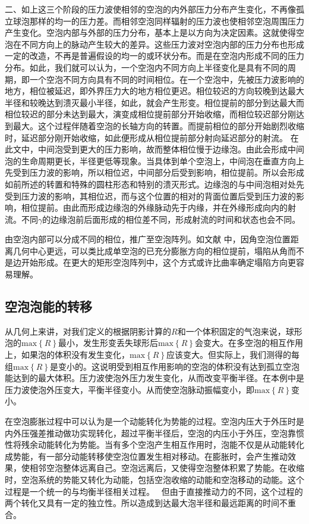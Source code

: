 二、如上这三个阶段的压力波使相邻的空泡的内外部压力分布产生变化，不再像孤立球泡那样的均一的压力差。而相邻空泡同样辐射的压力波也使相邻空泡周围压力产生变化。空泡内部与外部的压力分布，基本上是以方向为决定因素。这就使得空泡在不同方向上的脉动产生较大的差异。这些压力波对空泡内部的压力分布也形成一定的改造，不再是普遍假设的均一的或环状分布。而是在空泡内形成不同的压力分布。如此，我们就可以认为，一个空泡内不同方向上半径变化是具有不同的周期，即一个空泡不同方向具有不同的时间相位。在一个空泡中，先被压力波影响的地方，相位被延迟，即外界压力大的地方相位更迟。相位较迟的方向较晚到达最大半径和较晚达到溃灭最小半径，如此，就会产生形变。相位提前的部分到达最大而相位较迟的部分未达到最大，演变成相位提前部分开始收缩，而相位较迟部分刚达到最大。这个过程伴随着空泡的长轴方向的转置。而提前相位的部分开始剧烈收缩时，延迟部分刚开始收缩，如此便形成从相位提前部分射向延迟部分的射流。
在此文中，中间泡受到更大的压力影响，故而整体相位慢于边缘泡。由此会形成中间泡的生命周期更长，半径更低等现象。当具体到单个空泡上，中间泡在垂直方向上先受到压力波的影响，所以相位迟，中间部分后受到影响，相位提前。所以会形成如前所述的转置和特殊的圆柱形态和特别的溃灭形式。边缘泡的与中间泡相对处先受到压力波的影响，其相位迟，而与这个位置的相对的背面位置后受到压力波的影响，相位提前。由此而形成边缘泡的外缘脉动先于内缘，并在外缘形成向内的射流。不同$\gamma$的边缘泡前后面形成的相位差不同，形成射流的时间和状态也会不同。

由空泡内部可以分成不同的相位，推广至空泡阵列。如文献\cite{quinto-su_bubble_2010}
中，因角空泡位置距离几何中心更远，可以类比成单空泡的已充分膨胀方向的相位提前，塌陷从角而不是边开始形成。在更大的矩形空泡阵列中，这个方式或许比曲率确定塌陷方向更容易理解。

\subsection{空泡泡能的转移}

从几何上来讲，对我们定义的根据阴影计算的$R$和一个体积固定的气泡来说，球形泡的$\text{max}\left\{R\right\}$最小，发生形变丢失球形后$\text{max}\left\{R\right\}$会变大。在多空泡的相互作用上，如果泡的体积没有发生变化，$\text{max}\left\{R\right\}$应该变大。但实际上，我们测得的每组$\text{max}\left\{R\right\}$是变小的。这说明受到相互作用影响的空泡的体积没有达到孤立空泡能达到的最大体积。压力波使泡外压力发生变化，从而改变平衡半径。在本例中是压力波使泡外压变大，平衡半径变小。从而使空泡脉动振幅变小，即$\text{max}\left\{R\right\}$变小。

在空泡膨胀过程中可以认为是一个动能转化为势能的过程。空泡内压大于外压时是内外压强差推动做功实现转化，超过平衡半径后，空泡的内压小于外压，空泡靠惯性将残余动能转化为势能。当有多个空泡产生相互作用时，泡能不仅是从动能转化成势能，有一部分动能转移使空泡位置发生相对移动。在膨胀时，会产生推动效果，使相邻空泡整体远离自己。空泡远离后，又使得空泡整体积累了势能。在收缩时，空泡系统的势能又转化为动能，包括空泡收缩的动能和空泡移动的动能。这个过程是一个统一的与均衡半径相关过程。
~但由于直接推动力的不同，这个过程的两个转化又具有一定的独立性。所以造成到达最大泡半径和最远距离的时间不重合。

